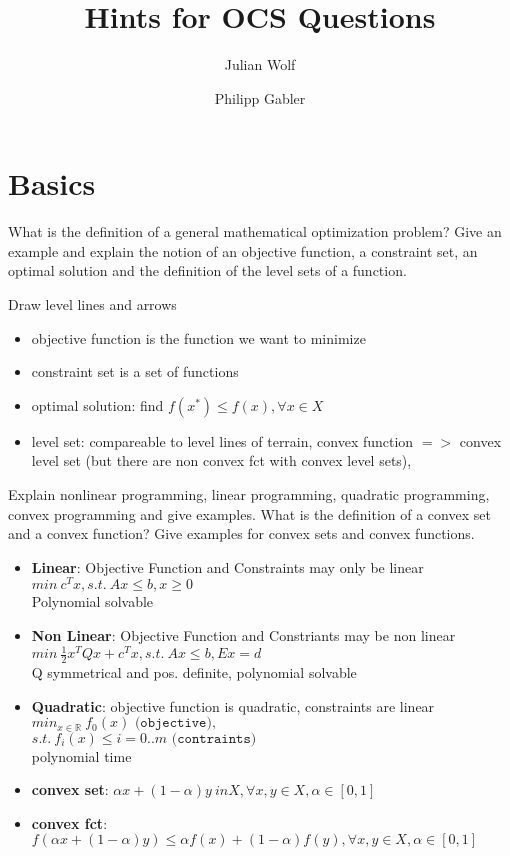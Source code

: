 \documentclass{article}
\title{Hints for OCS Questions}
\author{Julian Wolf \and Philipp Gabler}
\begin{document}
\maketitle

\section{Basics}

\begin{question}
  What is the definition of a general mathematical optimization problem?  Give an example and
  explain the notion of an objective function, a constraint set, an optimal solution and the
  definition of the level sets of a function.
\end{question}
Draw level lines and arrows
\begin{itemize}
\item objective function is the function we want to minimize
\item constraint set is a set of functions
\item optimal solution: find $f(x^*) \leq f(x), \forall x \in X$
\item level set: compareable to level lines of terrain, convex function $=>$ convex level set (but
  there are non convex fct with convex level sets),
\end{itemize}

\begin{question}
  Explain nonlinear programming, linear programming, quadratic programming, convex programming and
  give examples. What is the definition of a convex set and a convex function? Give examples for
  convex sets and convex functions.
\end{question}
\begin{itemize}
\item \textbf{Linear}: Objective Function and Constraints may only be linear
  $min\ c^Tx, s.t.\ Ax \leq b, x \geq 0$\\
  Polynomial solvable
\item \textbf{Non Linear}: Objective Function and Constriants may  be non linear
  $min\ \frac{1}{2} x^TQx + c^Tx, s.t.\ Ax \leq b, Ex = d$\\
  Q symmetrical and pos. definite, polynomial solvable
\item \textbf{Quadratic}: objective function is quadratic, constraints are linear	
  $min_{x \in \mathbb{R}}\ f_0(x) \texttt{ (objective)},$\\
  $s.t.\ f_i(x) \leq i=0..m \texttt{ (contraints)}$\\
  polynomial time
\item \textbf{convex set}: 
  $\alpha x + (1 - \alpha)y \ in X, \forall x, y \in X, \alpha \in [0, 1]$
\item \textbf{convex fct}:
  $f(\alpha x + (1 - \alpha)y) \leq \alpha f(x) + (1 - \alpha)f(y) , \forall x, y \in X, \alpha \in
  [0, 1]$
\end{itemize}
\end{document}
